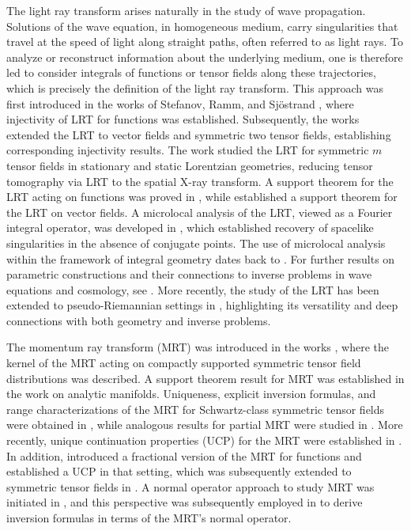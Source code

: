 \documentclass[11pt,a4paper,reqno]{amsart}
\begin{document}
The light ray transform arises naturally in the study of wave propagation. Solutions of the wave equation, in homogeneous medium, carry singularities that travel at the speed of light along straight paths, often referred to as light rays. To analyze or reconstruct information about the underlying medium, one is therefore led to consider integrals of functions or tensor fields along these trajectories, which is precisely the definition of the light ray transform. This approach was first introduced in the works of Stefanov, Ramm, and Sj\"ostrand \cite{stefanov1989inverse, ramm1991inverse}, where injectivity of LRT for functions was established.
Subsequently, the works \cite{krishnan2020inverse,krishnan2020uniqueness} extended the LRT to vector fields and symmetric two tensor fields, establishing corresponding injectivity results. The work \cite{feizmohammadi2021light} studied the LRT for symmetric $m$ tensor fields  in stationary and static Lorentzian geometries, reducing tensor tomography via LRT to the spatial X-ray transform. A support theorem for the LRT acting on functions was proved in \cite{stefanov2017support}, while \cite{siamak_vector_field_lrt} established a support theorem for the LRT on vector fields.  A microlocal analysis of the LRT, viewed as a Fourier integral operator, was developed in \cite{LLSU_lrt_Lorentzian}, which established recovery of spacelike singularities in the absence of conjugate points. The use of microlocal analysis within the framework of integral geometry dates back to \cite{GU_duke,Greenleaf_Uhlmann_duke}. For further results on parametric constructions and their connections to inverse problems in wave equations and cosmology, see \cite{Yiran_wang_lrt,Yiran_integral_geo_wave_equ,Yiran_cosmology_tom}.
More recently, the study of the LRT has been extended to pseudo-Riemannian settings in \cite{Ilmavirta_JDG, agrawal2025light}, highlighting its versatility and deep connections with both geometry and inverse problems.
	
The momentum ray transform (MRT) was introduced in the works \cites{Sharafutdinov_1986_momentum,Sharafutdinov_book}, where the kernel of the MRT acting on compactly supported symmetric tensor field distributions was described. A support theorem result for MRT was established in the work \cite{Anuj_Mishra_support} on analytic manifolds. Uniqueness, explicit inversion formulas, and range characterizations of the MRT for Schwartz-class symmetric tensor fields were obtained in \cite{krishnan2018momentum,krishnan2020momentum}, while analogous results for partial MRT were studied in \cite{MS_Siam,Mishra_Sahoo_PAMS}. More recently, unique continuation properties (UCP) for the MRT were established in \cite{AKS_UCP,IKS_Ucp}. In addition, \cite{IKS_Ucp} introduced a fractional version of the MRT for functions and established a UCP in that setting, which was subsequently extended to symmetric tensor fields in \cite{KJKP_fractional_mrt}.
A normal operator approach to study MRT was initiated in \cite{AKS_UCP}, and this perspective was subsequently employed in \cite{JKKS_I,JKKS_II} to derive inversion formulas in terms of the MRT’s normal operator. 
	
\end{document}
